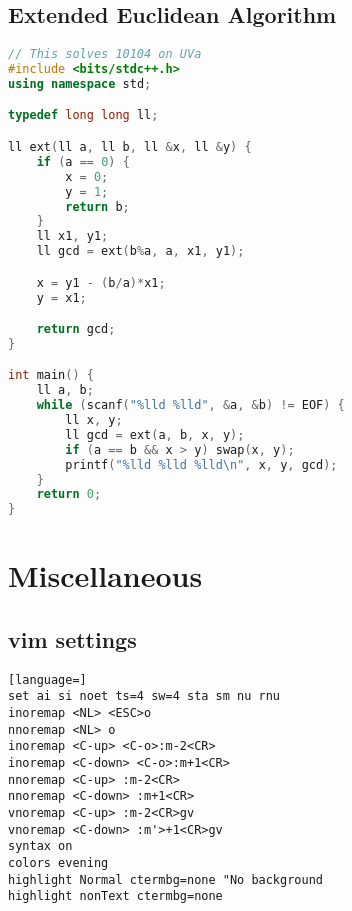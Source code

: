 \documentclass{article}
\begin{document}
\subsection{Extended Euclidean Algorithm}
\begin{lstlisting}[language=C++]
// This solves 10104 on UVa
#include <bits/stdc++.h>
using namespace std;

typedef long long ll;

ll ext(ll a, ll b, ll &x, ll &y) {
	if (a == 0) {
		x = 0;
		y = 1;
		return b;
	}
	ll x1, y1;
	ll gcd = ext(b%a, a, x1, y1);

	x = y1 - (b/a)*x1;
	y = x1;

	return gcd;
}

int main() {
	ll a, b;
	while (scanf("%lld %lld", &a, &b) != EOF) {
		ll x, y;
		ll gcd = ext(a, b, x, y);
		if (a == b && x > y) swap(x, y);
		printf("%lld %lld %lld\n", x, y, gcd);	
	}
    return 0;
}

\end{lstlisting}
\section{Miscellaneous}
\subsection{vim settings}
\begin{lstlisting}[language=]
set ai si noet ts=4 sw=4 sta sm nu rnu
inoremap <NL> <ESC>o
nnoremap <NL> o
inoremap <C-up> <C-o>:m-2<CR>
inoremap <C-down> <C-o>:m+1<CR>
nnoremap <C-up> :m-2<CR>
nnoremap <C-down> :m+1<CR>
vnoremap <C-up> :m-2<CR>gv
vnoremap <C-down> :m'>+1<CR>gv
syntax on
colors evening
highlight Normal ctermbg=none "No background
highlight nonText ctermbg=none
\end{lstlisting}
\end{document}
